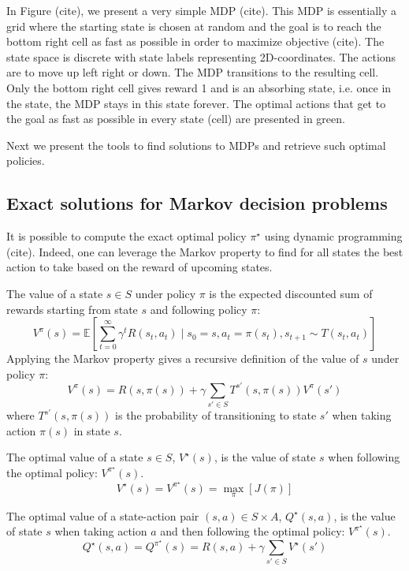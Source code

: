 In Figure (cite), we present a very simple MDP (cite).
This MDP is essentially a grid where the starting state is chosen at random and the goal is to reach the bottom right cell as fast as possible in order to maximize objective (cite).
The state space is discrete with state labels representing 2D-coordinates.
The actions are to move up left right or down. The MDP transitions to the resulting cell. 
Only the bottom right cell gives reward 1 and is an absorbing state, i.e. once in the state, the MDP stays in this state forever.
The optimal actions that get to the goal as fast as possible in every state (cell) are presented in green.

Next we present the tools to find solutions to MDPs and retrieve such optimal policies.

\subsection{Exact solutions for Markov decision problems}
It is possible to compute the exact optimal policy $\pi^\star$ using dynamic programming (cite).
Indeed, one can leverage the Markov property to find for all states the best action to take based on the reward of upcoming states.
\begin{definition} The value of a state $s\in S$ under policy $\pi$ is the expected discounted sum of rewards starting from state $s$ and following policy $\pi$:
    $$V^\pi(s) = \mathbb{E}\left[\sum_{t=0}^{\infty} \gamma^t R(s_t, a_t) \mid s_0 = s, a_t = \pi(s_t), s_{t+1} \sim T(s_t, a_t)\right]$$
    Applying the Markov property gives a recursive definition of the value of $s$ under policy $\pi$:
    $$V^\pi(s) = R(s,\pi(s)) + \gamma \sum_{s' \in S} T^{s'}(s,\pi(s))V^\pi(s')$$
    where $T^{s'}(s,\pi(s))$ is the probability of transitioning to state $s'$ when taking action $\pi(s)$ in state $s$.
\end{definition}
\begin{definition} The optimal value of a state $s\in S$, $V^\star(s)$, is the value of state $s$ when following the optimal policy: $V^{\pi^{\star}}(s)$.
    $$V^{\star}(s) = V^{\pi^{\star}}(s) = \underset{\pi}{\max}\left[J(\pi)\right]$$
\end{definition}
\begin{definition} The optimal value of a state-action pair $(s,a)\in S\times A$, $Q^\star(s,a)$, is the value of state $s$ when taking action $a$ and then following the optimal policy: $V^{\pi^{\star}}(s)$.
    $$Q^{\star}(s,a) = Q^{\pi^{\star}}(s) = R(s, a) + \gamma\sum_{s'\in S}V^{\star}(s')$$
\end{definition}

